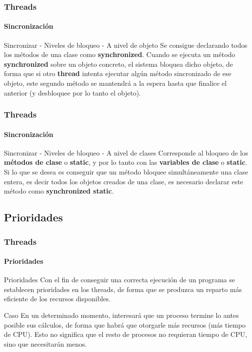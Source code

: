 \documentclass{beamer}
\begin{document}
    \begin{frame}
		\frametitle{Threads}
		\framesubtitle{Sincronizaci\'on}

        \begin{block}{Sincronizar - Niveles de bloqueo - A nivel de objeto} 
            Se consigue declarando todos los m\'etodos de una clase como \textbf{synchronized}. Cuando se ejecuta un m\'etodo \textbf{synchronized} sobre un objeto concreto, el sistema bloquea dicho objeto, de forma que si otro \textbf{thread} intenta ejecutar alg\'un m\'etodo sincronizado de ese objeto, este segundo m\'etodo se mantendr\'a a la espera hasta que finalice el anterior (y desbloquee por lo tanto el objeto).
        \end{block}
	\end{frame}

    \begin{frame}
		\frametitle{Threads}
		\framesubtitle{Sincronizaci\'on}

        \begin{block}{Sincronizar - Niveles de bloqueo - A nivel de clases} 
            Corresponde al bloqueo de los \textbf{m\'etodos de clase} o \textbf{static}, y por lo tanto con las \textbf{variables de clase} o \textbf{static}. Si lo que se desea es conseguir que un m\'etodo bloquee simult\'aneamente una clase entera, es decir todos los objetos creados de una clase, es necesario declarar este m\'etodo como \textbf{synchronized static}.
        \end{block}
	\end{frame}

    \subsection{Prioridades}
    
    \begin{frame}
		\frametitle{Threads}
		\framesubtitle{Prioridades}

        \begin{block}{Prioridades} 
            Con el fin de conseguir una correcta ejecuci\'on de un programa se establecen prioridades en los threads, de forma que se produzca un reparto m\'as eficiente de los recursos disponibles.
        \end{block}
        \begin{block}{Caso} 
            En un determinado momento, interesar\'a que un proceso termine lo antes posible sus c\'alculos, de forma que habr\'a que otorgarle m\'as recursos (m\'as tiempo de CPU). Esto no significa que el resto de procesos no requieran tiempo de CPU, sino que necesitar\'an menos.
        \end{block}
	\end{frame}
\end{document}
